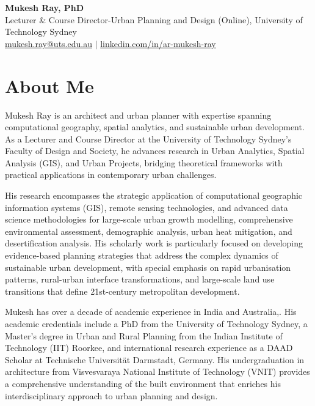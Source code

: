 \documentclass[a4paper,11pt]{article}
\begin{document}
\begin{center}
  {\Huge \bfseries Mukesh Ray, PhD}\\[2pt]
  {\small Lecturer \& Course Director-Urban Planning and Design (Online), University of Technology Sydney}\\
  \vspace{2pt}
  {\small \href{mailto:mukesh.ray@uts.edu.au}{mukesh.ray@uts.edu.au} $\vert$ \href{https://www.linkedin.com/in/ar-mukesh-ray/}{linkedin.com/in/ar-mukesh-ray}}
\end{center}

\section{About Me}
\justifying
Mukesh Ray is an architect and urban planner with expertise spanning computational geography, 
spatial analytics, and sustainable urban development. As a Lecturer and Course Director at the University of 
Technology Sydney's Faculty of Design and Society, he advances research in Urban Analytics, Spatial Analysis (GIS), 
and Urban Projects, bridging theoretical frameworks with practical applications in contemporary urban challenges.

\vspace{0.5em}
His research encompasses the strategic application of computational geographic information systems (GIS), 
remote sensing technologies, and advanced data science methodologies for large-scale urban growth modelling, 
comprehensive environmental assessment, demographic analysis, urban heat mitigation, and desertification analysis. 
His scholarly work is particularly focused on developing evidence-based planning strategies that address the complex 
dynamics of sustainable urban development, with special emphasis on rapid urbanisation patterns, rural-urban interface 
transformations, and large-scale land use transitions that define 21st-century metropolitan development.

\vspace{0.5em}
Mukesh has over a decade of academic experience in India and Australia,. His academic credentials include a PhD 
from the University of Technology Sydney, a Master's degree in Urban and Rural Planning from the 
Indian Institute of Technology (IIT) Roorkee, and international research experience as a DAAD Scholar at Technische 
Universität Darmstadt, Germany. His undergraduation in architecture from Visvesvaraya National Institute of 
Technology (VNIT) provides a comprehensive understanding of the built environment that enriches his interdisciplinary 
approach to urban planning and design.
\end{document}
